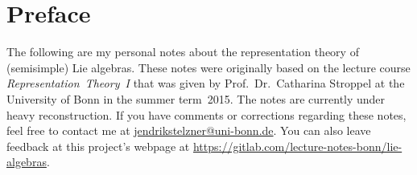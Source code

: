 \chapter*{Preface}

The following are my personal notes about the representation theory of (semisimple) Lie algebras.
These notes were originally based on the lecture course \emph{Representation~Theory~I} that was given by Prof.~Dr.~Catharina Stroppel at the University of Bonn in the summer term~2015.
The notes are currently under heavy reconstruction.
If you have comments or corrections regarding these notes, feel free to contact me at \href{mailto:jendrikstelzner@uni-bonn.de}{jendrikstelzner@uni-bonn.de}.
You can also leave feedback at this project’s webpage at \url{https://gitlab.com/lecture-notes-bonn/lie-algebras}.
